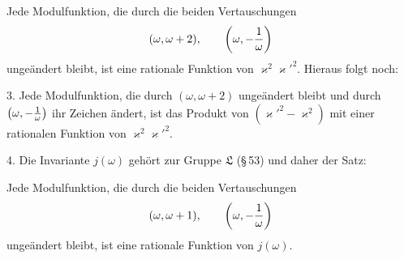 \documentclass[11pt]{article}
\begin{document}
Jede Modulfunktion, die durch die beiden Vertauschungen
\[
(\omega,\omega+2),
\qquad
\left(\omega,-{1\over\omega}\right)
\]
ungeändert bleibt, ist eine rationale Funktion von $\varkappa^2\varkappa'^2$. Hieraus folgt noch:

3. Jede Modulfunktion, die durch $(\omega,\omega+2)$ ungeändert bleibt und durch $\left(\omega,-{1\over\omega}\right)$ ihr Zeichen ändert, ist das Produkt von $(\varkappa'^2-\varkappa^2)$ mit einer rationalen Funktion von $\varkappa^2\varkappa'^2$.

4. Die Invariante $j(\omega)$ gehört zur Gruppe $\mathfrak L$ (\S\,53) und daher der Satz:

Jede Modulfunktion, die durch die beiden Vertauschungen
\[
(\omega,\omega+1),
\qquad
\left(\omega,-{1\over\omega}\right)
\]
ungeändert bleibt, ist eine rationale Funktion von $j(\omega)$.
\end{document}
